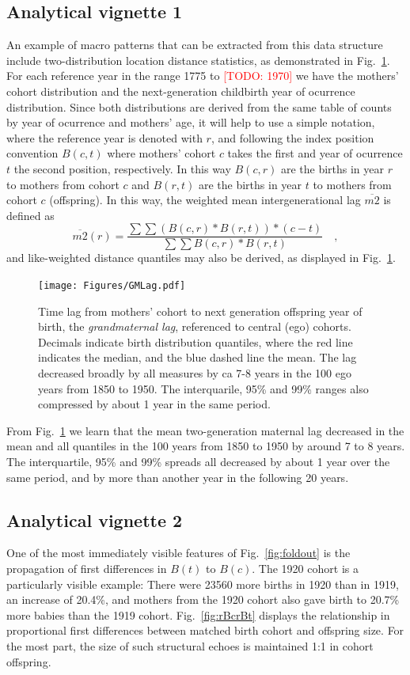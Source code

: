 \documentclass{article}
\renewcommand{\todo}[1]{\textcolor{red}{[TODO: #1]}}
\begin{document}
\subsection{Analytical vignette 1}
An example of macro patterns that can be extracted from this data structure include two-distribution location distance statistics, as demonstrated in Fig.~\ref{fig:gmlag}. For each reference year in the range 1775 to \todo{1970} we have the mothers' cohort distribution and the next-generation childbirth year of ocurrence distribution. Since both distributions are derived from the same table of counts by year of ocurrence and mothers' age, it will help to use a simple notation, where the reference year is denoted with $r$, and following the index position convention $B(c,t)$ where mothers' cohort $c$ takes the first and year of ocurrence $t$ the second position, respectively. In this way $B(c,r)$ are the births in year $r$ to mothers from cohort $c$ and $B(r,t)$ are the births in year $t$ to mothers from cohort $c$ (offspring). In this way, the weighted mean intergenerational lag $\overline{m2}$ is defined as
\begin{equation}
\overline{m2}(r) = \frac{\sum\sum (B(c,r)*B(r,t)) * (c - t)}{\sum\sum B(c,r)*B(r,t)} \quad \mathrm{,}
\end{equation}
and like-weighted distance quantiles may also be derived, as displayed in Fig.~\ref{fig:gmlag}.

\begin{figure}
\texttt{[image: Figures/GMLag.pdf]}
\caption{Time lag from mothers' cohort to next generation offspring year of birth, the \emph{grandmaternal lag}, referenced to central (ego) cohorts. Decimals indicate birth distribution quantiles, where the red line indicates the median, and the blue dashed line the mean. The lag decreased broadly by all measures by ca 7-8 years in the 100 ego years from 1850 to 1950. The interquarile, 95\% and 99\% ranges also compressed by about 1 year in the same period.}
\label{fig:gmlag}
\end{figure}

From Fig.~\ref{fig:gmlag} we learn that the mean two-generation maternal lag decreased in the mean and all quantiles in the 100 years from 1850 to 1950 by around 7 to 8 years. The interquartile, 95\% and 99\% spreads all decreased by about 1 year over the same period, and by more than another year in the following 20 years.

\subsection{Analytical vignette 2}
One of the most immediately visible features of Fig.~\ref{fig:foldout} is the propagation of first differences in $B(t)$ to $B(c)$. The 1920 cohort is a particularly visible example: There were 23560 more births in 1920 than in 1919, an increase of 20.4\%, and mothers from the 1920 cohort also gave birth to 20.7\% more babies than the 1919 cohort. Fig.~\ref{fig:rBcrBt} displays the relationship in proportional first differences between matched birth cohort and offspring size. For the most part, the size of such structural echoes is maintained 1:1 in cohort offspring.
\end{document}
